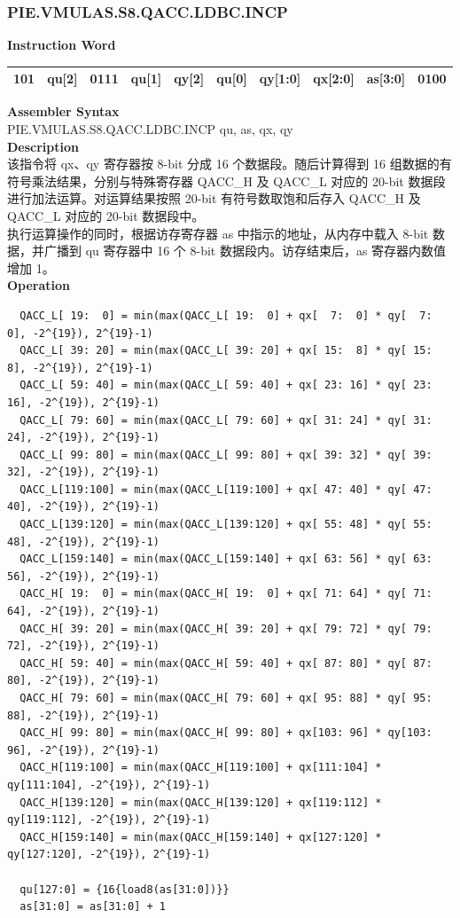 \newpage
\subsubsection{PIE.VMULAS.S8.QACC.LDBC.INCP}\label{instruction:PIEVMULASS8QACCLDBCINCP}
\setlength\tabcolsep{6pt}
\textbf{Instruction Word} \\
\begin{tabular}{|c|c|c|c|c|c|c|c|c|c|}
	\hline
	101 & qu[2] & 0111 & qu[1] & qy[2] & qu[0] & qy[1:0] & qx[2:0] & as[3:0] & 0100 \\
	\hline
\end{tabular}

\textbf{Assembler Syntax} \\
PIE.VMULAS.S8.QACC.LDBC.INCP qu, as, qx, qy \\
\textbf{Description} \\
该指令将 qx、qy 寄存器按 8-bit 分成 16 个数据段。随后计算得到 16 组数据的有符号乘法结果，分别与特殊寄存器 QACC\_H 及 QACC\_L 对应的 20-bit 数据段进行加法运算。对运算结果按照 20-bit 有符号数取饱和后存入 QACC\_H 及 QACC\_L 对应的 20-bit 数据段中。\\
执行运算操作的同时，根据访存寄存器 as 中指示的地址，从内存中载入 8-bit 数据，并广播到 qu 寄存器中 16 个 8-bit 数据段内。访存结束后，as 寄存器内数值增加 1。\\
\textbf{Operation}
\begin{lstlisting}
  QACC_L[ 19:  0] = min(max(QACC_L[ 19:  0] + qx[  7:  0] * qy[  7:  0], -2^{19}), 2^{19}-1)
  QACC_L[ 39: 20] = min(max(QACC_L[ 39: 20] + qx[ 15:  8] * qy[ 15:  8], -2^{19}), 2^{19}-1)
  QACC_L[ 59: 40] = min(max(QACC_L[ 59: 40] + qx[ 23: 16] * qy[ 23: 16], -2^{19}), 2^{19}-1)
  QACC_L[ 79: 60] = min(max(QACC_L[ 79: 60] + qx[ 31: 24] * qy[ 31: 24], -2^{19}), 2^{19}-1)
  QACC_L[ 99: 80] = min(max(QACC_L[ 99: 80] + qx[ 39: 32] * qy[ 39: 32], -2^{19}), 2^{19}-1)
  QACC_L[119:100] = min(max(QACC_L[119:100] + qx[ 47: 40] * qy[ 47: 40], -2^{19}), 2^{19}-1)
  QACC_L[139:120] = min(max(QACC_L[139:120] + qx[ 55: 48] * qy[ 55: 48], -2^{19}), 2^{19}-1)
  QACC_L[159:140] = min(max(QACC_L[159:140] + qx[ 63: 56] * qy[ 63: 56], -2^{19}), 2^{19}-1)
  QACC_H[ 19:  0] = min(max(QACC_H[ 19:  0] + qx[ 71: 64] * qy[ 71: 64], -2^{19}), 2^{19}-1)
  QACC_H[ 39: 20] = min(max(QACC_H[ 39: 20] + qx[ 79: 72] * qy[ 79: 72], -2^{19}), 2^{19}-1)
  QACC_H[ 59: 40] = min(max(QACC_H[ 59: 40] + qx[ 87: 80] * qy[ 87: 80], -2^{19}), 2^{19}-1)
  QACC_H[ 79: 60] = min(max(QACC_H[ 79: 60] + qx[ 95: 88] * qy[ 95: 88], -2^{19}), 2^{19}-1)
  QACC_H[ 99: 80] = min(max(QACC_H[ 99: 80] + qx[103: 96] * qy[103: 96], -2^{19}), 2^{19}-1)
  QACC_H[119:100] = min(max(QACC_H[119:100] + qx[111:104] * qy[111:104], -2^{19}), 2^{19}-1)
  QACC_H[139:120] = min(max(QACC_H[139:120] + qx[119:112] * qy[119:112], -2^{19}), 2^{19}-1)
  QACC_H[159:140] = min(max(QACC_H[159:140] + qx[127:120] * qy[127:120], -2^{19}), 2^{19}-1)

  qu[127:0] = {16{load8(as[31:0])}}
  as[31:0] = as[31:0] + 1
\end{lstlisting}

